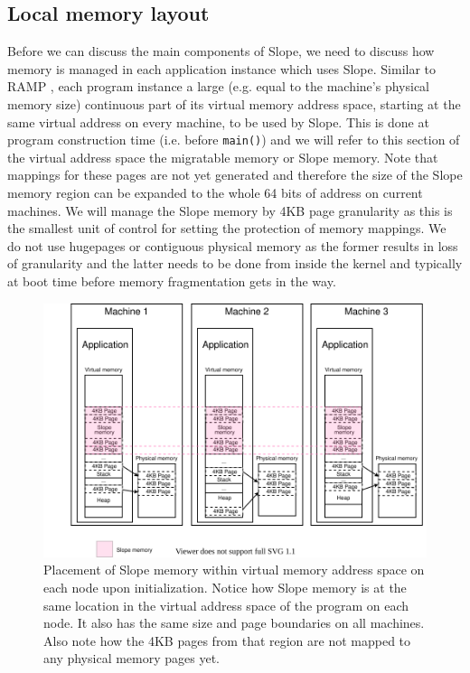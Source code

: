 \subsection{Local memory layout}
Before we can discuss the main components of Slope, we need to discuss how
memory is managed in each application instance which uses Slope. Similar to
RAMP \cite{memon2018ramp}, each program instance a
large   (e.g. equal to the machine's physical memory size) continuous part
of its virtual memory address space, starting at the same virtual address
on every machine, to be used by Slope.
This is done at program construction
time (i.e. before \texttt{main()}) and we will refer to this section of the virtual
address space the migratable memory or Slope memory. Note that mappings for
these pages are not yet generated and therefore the size of the Slope memory
region can be expanded to the whole 64 bits of address on current machines.
We will manage the Slope memory by 4KB page granularity as this is the
smallest unit of control for setting the protection of memory mappings.
We do not use 
hugepages or contiguous physical memory as the former results in
loss of granularity and the latter needs to be done from inside the kernel and
typically at boot time before memory fragmentation gets in the way.

\begin{figure}[t]
\centering
{}
\includegraphics[width=1\textwidth]{local-memory-management-phys-log.drawio}
\caption{
    Placement of Slope memory within virtual memory address space on each node
    upon initialization.
    Notice how Slope memory is at the same location in the virtual address
    space of the program on each node. It also has the same size and
    page boundaries on all machines. Also note how
    the 4KB pages from that region are not mapped to any physical memory pages
    yet.
}
\label{fig:localmemorymanagementphyslog}
\end{figure}

